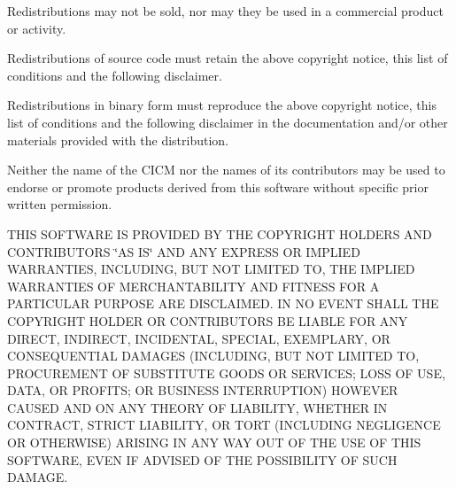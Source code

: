 \begin{DoxyItemize}
\item Redistributions may not be sold, nor may they be used in a commercial product or activity.
\item Redistributions of source code must retain the above copyright notice, this list of conditions and the following disclaimer.
\item Redistributions in binary form must reproduce the above copyright notice, this list of conditions and the following disclaimer in the documentation and/or other materials provided with the distribution.
\item Neither the name of the C\-I\-C\-M nor the names of its contributors may be used to endorse or promote products derived from this software without specific prior written permission.
\end{DoxyItemize}

T\-H\-I\-S S\-O\-F\-T\-W\-A\-R\-E I\-S P\-R\-O\-V\-I\-D\-E\-D B\-Y T\-H\-E C\-O\-P\-Y\-R\-I\-G\-H\-T H\-O\-L\-D\-E\-R\-S A\-N\-D C\-O\-N\-T\-R\-I\-B\-U\-T\-O\-R\-S \char`\"{}\-A\-S I\-S\char`\"{} A\-N\-D A\-N\-Y E\-X\-P\-R\-E\-S\-S O\-R I\-M\-P\-L\-I\-E\-D W\-A\-R\-R\-A\-N\-T\-I\-E\-S, I\-N\-C\-L\-U\-D\-I\-N\-G, B\-U\-T N\-O\-T L\-I\-M\-I\-T\-E\-D T\-O, T\-H\-E I\-M\-P\-L\-I\-E\-D W\-A\-R\-R\-A\-N\-T\-I\-E\-S O\-F M\-E\-R\-C\-H\-A\-N\-T\-A\-B\-I\-L\-I\-T\-Y A\-N\-D F\-I\-T\-N\-E\-S\-S F\-O\-R A P\-A\-R\-T\-I\-C\-U\-L\-A\-R P\-U\-R\-P\-O\-S\-E A\-R\-E D\-I\-S\-C\-L\-A\-I\-M\-E\-D. I\-N N\-O E\-V\-E\-N\-T S\-H\-A\-L\-L T\-H\-E C\-O\-P\-Y\-R\-I\-G\-H\-T H\-O\-L\-D\-E\-R O\-R C\-O\-N\-T\-R\-I\-B\-U\-T\-O\-R\-S B\-E L\-I\-A\-B\-L\-E F\-O\-R A\-N\-Y D\-I\-R\-E\-C\-T, I\-N\-D\-I\-R\-E\-C\-T, I\-N\-C\-I\-D\-E\-N\-T\-A\-L, S\-P\-E\-C\-I\-A\-L, E\-X\-E\-M\-P\-L\-A\-R\-Y, O\-R C\-O\-N\-S\-E\-Q\-U\-E\-N\-T\-I\-A\-L D\-A\-M\-A\-G\-E\-S (I\-N\-C\-L\-U\-D\-I\-N\-G, B\-U\-T N\-O\-T L\-I\-M\-I\-T\-E\-D T\-O, P\-R\-O\-C\-U\-R\-E\-M\-E\-N\-T O\-F S\-U\-B\-S\-T\-I\-T\-U\-T\-E G\-O\-O\-D\-S O\-R S\-E\-R\-V\-I\-C\-E\-S; L\-O\-S\-S O\-F U\-S\-E, D\-A\-T\-A, O\-R P\-R\-O\-F\-I\-T\-S; O\-R B\-U\-S\-I\-N\-E\-S\-S I\-N\-T\-E\-R\-R\-U\-P\-T\-I\-O\-N) H\-O\-W\-E\-V\-E\-R C\-A\-U\-S\-E\-D A\-N\-D O\-N A\-N\-Y T\-H\-E\-O\-R\-Y O\-F L\-I\-A\-B\-I\-L\-I\-T\-Y, W\-H\-E\-T\-H\-E\-R I\-N C\-O\-N\-T\-R\-A\-C\-T, S\-T\-R\-I\-C\-T L\-I\-A\-B\-I\-L\-I\-T\-Y, O\-R T\-O\-R\-T (I\-N\-C\-L\-U\-D\-I\-N\-G N\-E\-G\-L\-I\-G\-E\-N\-C\-E O\-R O\-T\-H\-E\-R\-W\-I\-S\-E) A\-R\-I\-S\-I\-N\-G I\-N A\-N\-Y W\-A\-Y O\-U\-T O\-F T\-H\-E U\-S\-E O\-F T\-H\-I\-S S\-O\-F\-T\-W\-A\-R\-E, E\-V\-E\-N I\-F A\-D\-V\-I\-S\-E\-D O\-F T\-H\-E P\-O\-S\-S\-I\-B\-I\-L\-I\-T\-Y O\-F S\-U\-C\-H D\-A\-M\-A\-G\-E. 

